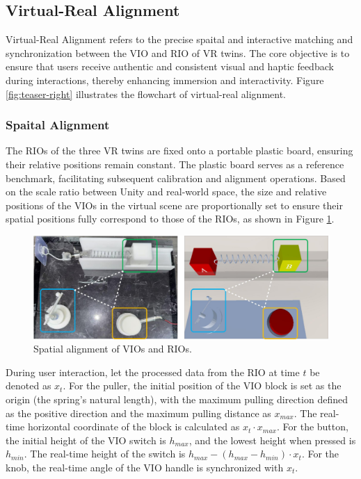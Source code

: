 \subsection{Virtual-Real Alignment}
Virtual-Real Alignment refers to the precise spaital and interactive matching and synchronization between the VIO and RIO of VR twins. The core objective is to ensure that users receive authentic and consistent visual and haptic feedback during interactions, thereby enhancing immersion and interactivity. Figure \ref{fig:teaser-right} illustrates the flowchart of virtual-real alignment.

\subsubsection{Spaital Alignment}
The RIOs of the three VR twins are fixed onto a portable plastic board, ensuring their relative positions remain constant. The plastic board serves as a reference benchmark, facilitating subsequent calibration and alignment operations. Based on the scale ratio between Unity and real-world space, the size and relative positions of the VIOs in the virtual scene are proportionally set to ensure their spatial positions fully correspond to those of the RIOs, as shown in Figure \ref{fig:spaital-alignment}.

\begin{figure}
  \centering
  \includegraphics[width=\linewidth]{image/spaital-alignment.pdf}
  \caption{Spatial alignment of VIOs and RIOs.}
  \label{fig:spaital-alignment}
\end{figure}

During user interaction, let the processed data from the RIO at time $t$ be denoted as $x_{t}$. For the puller, the initial position of the VIO block is set as the origin (the spring's natural length), with the maximum pulling direction defined as the positive direction and the maximum pulling distance as $x_{max}$. The real-time horizontal coordinate of the block is calculated as $x_{t} \cdot x_{max}$. For the button, the initial height of the VIO switch is $h_{max}$, and the lowest height when pressed is $h_{min}$. The real-time height of the switch is $h_{max}-(h_{max}-h_{min}) \cdot x_{t}$. For the knob, the real-time angle of the VIO handle is synchronized with $x_{t}$.

